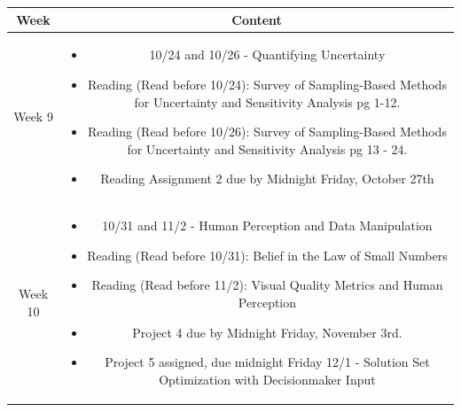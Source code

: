 \documentclass[11pt]{article}
\begin{document}
\begin{table}[h!]
\small %
\begin{tabular}{ | c | c | }
\hline
\textbf{Week} & \textbf{Content} \\
\hline

Week 9 & \begin{minipage}{.85\textwidth}
\begin{itemize} \itemsep-0.4em
	\vspace{1mm}
	\item 10/24 and 10/26 - Quantifying Uncertainty
	
	\item Reading (Read before 10/24): Survey of Sampling-Based Methods for Uncertainty and Sensitivity Analysis pg 1-12.
	\item Reading (Read before 10/26): Survey of Sampling-Based Methods for Uncertainty and Sensitivity Analysis pg 13 - 24.
	
	\item Reading Assignment 2 due by Midnight Friday, October 27th
	
	\vspace{1mm}
\end{itemize}
\end{minipage} \\
\hline

Week 10 & \begin{minipage}{.85\textwidth}
\begin{itemize} \itemsep-0.4em
	\vspace{1mm}
	\item 10/31 and 11/2 - Human Perception and Data Manipulation
	
	\item Reading (Read before 10/31): Belief in the Law of Small Numbers
	\item Reading (Read before 11/2): Visual Quality Metrics and Human Perception
	
	
	\item Project 4 due by Midnight Friday, November 3rd.
	\item Project 5 assigned, due midnight Friday 12/1 - Solution Set Optimization with Decisionmaker Input
	
	\vspace{1mm}
\end{itemize}
\end{minipage} \\
\hline


\end{tabular}
\end{table}
\end{document}
